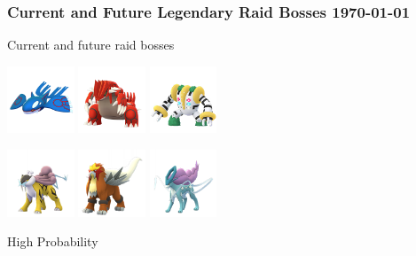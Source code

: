 \documentclass[12pt]{beamer}
\begin{document}
\begin{frame}
\frametitle{Current and Future Legendary Raid Bosses \hspace{3cm} \today}

\begin{block}{}
\begin{footnotesize}

\begin{center}
Current and future raid bosses

 \includegraphics[width=2cm]{../../images/pokemon/kyogre.png}\quad\quad
 \includegraphics[width=2cm]{../../images/pokemon/groudon.png}\quad\quad
 \includegraphics[width=2cm]{../../images/pokemon/regigigas.png}
 
 \includegraphics[width=2cm]{../../images/pokemon/raikou.png}\quad\quad
 \includegraphics[width=2cm]{../../images/pokemon/entei.png}\quad\quad
 \includegraphics[width=2cm]{../../images/pokemon/suicune.png}

\bigskip\bigskip

High Probability 


\end{center}
\end{footnotesize}
\end{block}
\end{frame}
\end{document}
